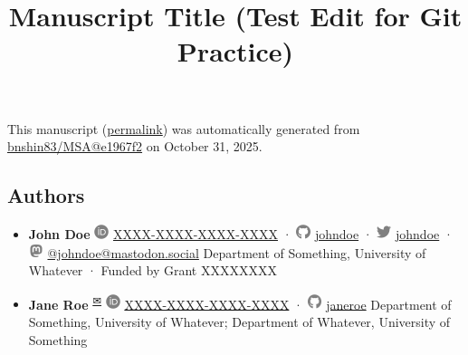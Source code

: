 \documentclass[
]{article}
\title{Manuscript Title (Test Edit for Git Practice)}
\author{}
\date{}
\begin{document}
\maketitle

This manuscript
(\href{https://bnshin83.github.io/MSA/v/e1967f274f0dc5ff3fa27200dd606d17eab0127a/}{permalink})
was automatically generated
from \href{https://github.com/bnshin83/MSA/tree/e1967f274f0dc5ff3fa27200dd606d17eab0127a}{bnshin83/MSA@e1967f2}
on October 31, 2025.

\hypertarget{authors}{%
\subsection{Authors}\label{authors}}

\begin{itemize}
\item
  \textbf{John Doe}
  \includegraphics[width=0.16667in,height=0.16667in]{images/orcid.svg}
  \href{https://orcid.org/XXXX-XXXX-XXXX-XXXX}{XXXX-XXXX-XXXX-XXXX}
  · \includegraphics[width=0.16667in,height=0.16667in]{images/github.svg}
  \href{https://github.com/johndoe}{johndoe}
  · \includegraphics[width=0.16667in,height=0.16667in]{images/twitter.svg}
  \href{https://twitter.com/johndoe}{johndoe}
  · \includegraphics[width=0.16667in,height=0.16667in]{images/mastodon.svg}
  \href{https://mastodon.social/@johndoe}{@johndoe@mastodon.social}
  Department of Something, University of Whatever
  · Funded by Grant XXXXXXXX
\item
  \textbf{Jane Roe}
  \textsuperscript{\protect\hyperlink{correspondence}{✉}}
  \includegraphics[width=0.16667in,height=0.16667in]{images/orcid.svg}
  \href{https://orcid.org/XXXX-XXXX-XXXX-XXXX}{XXXX-XXXX-XXXX-XXXX}
  · \includegraphics[width=0.16667in,height=0.16667in]{images/github.svg}
  \href{https://github.com/janeroe}{janeroe}
  Department of Something, University of Whatever; Department of Whatever, University of Something
\end{itemize}
\end{document}
